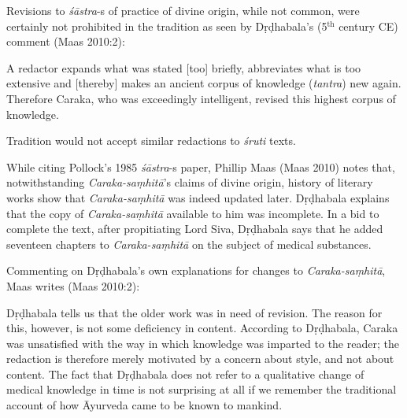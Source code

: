 Revisions to {\sl śāstra}-s of practice of divine origin, while not common, were certainly not prohibited in the tradition as seen by Dṛḍhabala's (5$^{\text{th}}$ century CE) comment (Maas 2010:2):
\begin{myquote}
A redactor expands what was stated [too] briefly, abbreviates what is too extensive and [thereby] makes an ancient corpus of knowledge ({\sl tantra}) new again. Therefore Caraka, who was exceedingly intelligent, revised this highest corpus of knowledge.
\end{myquote}

Tradition would not accept similar redactions to {\sl śruti} texts.

While citing Pollock's 1985 {\sl śāstra}-s paper, Phillip Maas (Maas 2010) notes that, notwithstanding {\sl Caraka-saṃhitā}'s claims of divine origin, history of literary works show that {\sl Caraka-saṃhitā} was indeed updated later.  Dṛḍhabala explains that the copy of {\sl Caraka-saṃhitā} available to him was incomplete.  In a bid to complete the text, after propitiating Lord Siva, Dṛḍhabala says that he added seventeen chapters to {\sl Caraka-saṃhitā} on the subject of medical substances.

Commenting on Dṛḍhabala's own explanations for changes to {\sl Caraka-saṃhitā}, Maas writes (Maas 2010:2): 
\begin{myquote}
Dṛḍhabala tells us that the older work was in need of revision. The reason for this, however, is not some deficiency in content. According to Dṛḍhabala, Caraka was unsatisfied with the way in which knowledge was imparted to the reader; the redaction is therefore merely motivated by a concern about style, and not about content. The fact that Dṛḍhabala does not refer to a qualitative change of medical knowledge in time is not surprising at all if we remember the traditional account of how Āyurveda came to be known to mankind.
\end{myquote}

